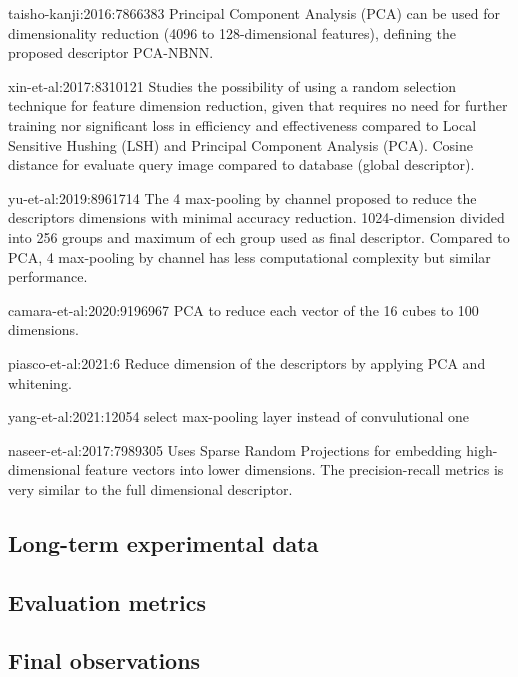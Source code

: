 taisho-kanji:2016:7866383
Principal Component Analysis (PCA) can be used for dimensionality reduction (4096 to 128-dimensional features), defining the proposed descriptor PCA-NBNN.

xin-et-al:2017:8310121
Studies the possibility of using a random selection technique for feature dimension reduction, given that requires no need for further training nor significant loss in efficiency and effectiveness compared to Local Sensitive Hushing (LSH) and Principal Component Analysis (PCA).
Cosine distance for evaluate query image compared to database (global descriptor).

yu-et-al:2019:8961714
The 4 max-pooling by channel proposed to reduce the descriptors dimensions with minimal accuracy reduction. 1024-dimension divided into 256 groups and maximum of ech group used as final descriptor. Compared to PCA, 4 max-pooling by channel has less computational complexity but similar performance.

camara-et-al:2020:9196967
PCA to reduce each vector of the 16 cubes to 100 dimensions.

piasco-et-al:2021:6
Reduce dimension of the descriptors by applying PCA and whitening.

yang-et-al:2021:12054
select max-pooling layer instead of convulutional one

naseer-et-al:2017:7989305
Uses Sparse Random Projections for embedding high-dimensional feature vectors into lower dimensions. The precision-recall metrics is very similar to the full dimensional descriptor.

\subsection{Long-term experimental data}
\label{sec:discussion:experiments}



\subsection{Evaluation metrics}
\label{sec:discussion:metrics}

\subsection{Final observations}
\label{sec:discussion:observations}

